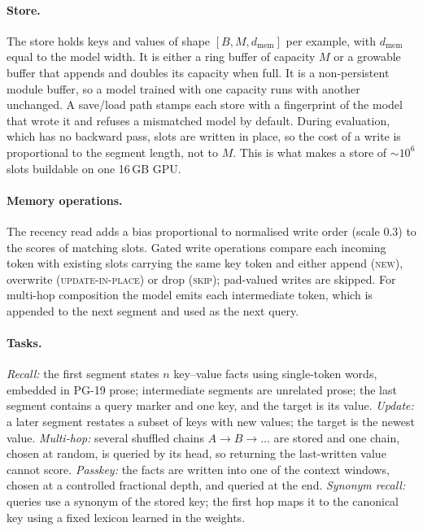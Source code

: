\paragraph{Store.} The store holds keys and values of shape $[B, M, d_\text{mem}]$ per example,
with $d_\text{mem}$ equal to the model width. It is either a ring buffer of capacity $M$ or a growable buffer that
appends and doubles its capacity when full. It is a non-persistent module buffer, so a model
trained with one capacity runs with another unchanged. A save/load path stamps each store with
a fingerprint of the model that wrote it and refuses a mismatched model by default. During
evaluation, which has no backward pass, slots are written in place, so the cost of a write is
proportional to the segment length, not to $M$. This is what makes a store of
$\sim$$10^6$ slots buildable on one 16\,GB GPU.

\paragraph{Memory operations.} The recency read adds a bias proportional to normalised write
order (scale 0.3) to the scores of matching slots. Gated write operations compare each
incoming token with existing slots carrying the same key token and either append
(\textsc{new}), overwrite (\textsc{update-in-place}) or drop (\textsc{skip}); pad-valued
writes are skipped. For multi-hop composition the model emits each intermediate token, which
is appended to the next segment and used as the next query.

\paragraph{Tasks.} \emph{Recall:} the first segment states $n$ key--value facts using
single-token words, embedded in PG-19 prose; intermediate segments are unrelated prose; the
last segment contains a query marker and one key, and the target is its value.
\emph{Update:} a later segment restates a subset of keys with new values; the target is the
newest value. \emph{Multi-hop:} several shuffled chains $A\!\to\!B\!\to\!\dots$ are stored and
one chain, chosen at random, is queried by its head, so returning the last-written value
cannot score. \emph{Passkey:} the facts are written into one of the context windows, chosen at
a controlled fractional depth, and queried at the end. \emph{Synonym recall:} queries use a
synonym of the stored key; the first hop maps it to the canonical key using a fixed lexicon
learned in the weights.

